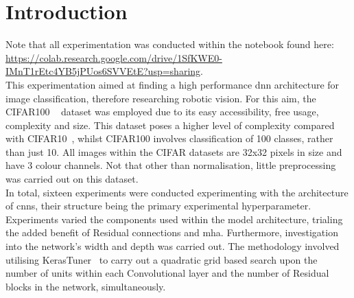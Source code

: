 \documentclass[11pt]{article}
\def\COLABLINK{https://colab.research.google.com/drive/1SfKWE0-IMnT1rEtc4YB5jPUos6SVVEtE?usp=sharing}
\def\DATASET{CIFAR100 }
\begin{document}
\section{Introduction}
Note that all experimentation was conducted within the notebook found here: \url{\COLABLINK}.\\
This experimentation aimed at finding a high performance \acrshort{dnn} architecture for image classification, therefore researching robotic vision. For this aim, the \DATASET~\cite{cifar100} dataset was employed due to its easy accessibility, free usage, complexity and size. This dataset poses a higher level of complexity compared with CIFAR10~\cite{cifar100}, whilst \DATASET involves classification of 100 classes, rather than just 10. All images within the CIFAR datasets are 32x32 pixels in size and have 3 colour channels. Not that other than normalisation, little preprocessing was carried out on this dataset.\\
In total, sixteen experiments were conducted experimenting with the architecture of \acrshort{cnn}s, their structure being the primary experimental hyperparameter. Experiments varied the components used within the model architecture, trialing the added benefit of Residual connections and \acrfull{mha}. Furthermore, investigation into the network's width and depth was carried out. The methodology involved utilising KerasTuner~\cite{kerastuner} to carry out a quadratic grid based search upon the number of units within each Convolutional layer and the number of Residual blocks in the network, simultaneously.\\
\end{document}
